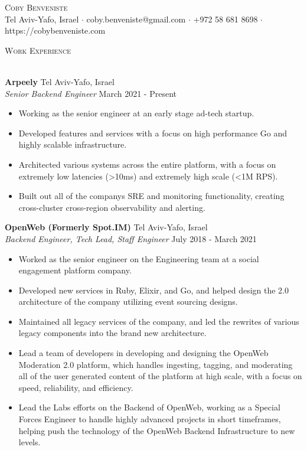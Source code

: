 \documentclass[a4paper]{article}
\newcommand{\lineunder} {
    \vspace*{-8pt} \\
    \hspace*{-18pt} \hrulefill \\
}
\newcommand{\header} [1] {
    {\hspace*{-18pt}\vspace*{6pt} \textsc{#1}}
    \vspace*{-6pt} \lineunder
}
\begin{document}
\vspace*{-40pt}

    

\vspace*{-10pt}
\begin{center}
	{\Huge \scshape {Coby Benveniste}}\\
	Tel Aviv-Yafo, Israel $\cdot$ coby.benveniste@gmail.com $\cdot$ +972 58 681 8698 $\cdot$ https://cobybenveniste.com\\
\end{center}



\header{Work Experience}
\vspace{1mm}

\textbf{Arpeely} \hfill Tel Aviv-Yafo, Israel\\
\textit{Senior Backend Engineer} \hfill March 2021 - Present\\
\vspace{-1mm}
\begin{itemize} \itemsep 1pt
	\item Working as the senior engineer at an early stage ad-tech startup.
	\item Developed features and services with a focus on high performance Go and highly scalable infrastructure.
	\item Architected various systems across the entire platform, with a focus on extremely low latencies (\textgreater{}10ms) and extremely high scale (\textless{}1M RPS).
	\item Built out all of the company\textquotesingle{}s SRE and monitoring functionality, creating cross-cluster cross-region observability and alerting.
\end{itemize}
\textbf{OpenWeb (Formerly Spot.IM)} \hfill Tel Aviv-Yafo, Israel\\
\textit{Backend Engineer, Tech Lead, Staff Engineer} \hfill July 2018 - March 2021\\
\vspace{-1mm}
\begin{itemize} \itemsep 1pt
	\item Worked as the senior engineer on the Engineering team at a social engagement platform company.
	\item Developed new services in Ruby, Elixir, and Go, and helped design the 2.0 architecture of the company utilizing event sourcing designs.
	\item Maintained all legacy services of the company, and led the rewrites of various legacy components into the brand new architecture.
	\item Lead a team of developers in developing and designing the OpenWeb Moderation 2.0 platform, which handles ingesting, tagging, and moderating all of the user generated content of the platform at high scale, with a focus on speed, reliability, and efficiency.
	\item Lead the Labs efforts on the Backend of OpenWeb, working as a \textquotedbl{}Special Forces Engineer\textquotedbl{} to handle highly advanced projects in short timeframes, helping push the technology of the OpenWeb Backend Infrastructure to new levels.
\end{itemize}
\end{document}
